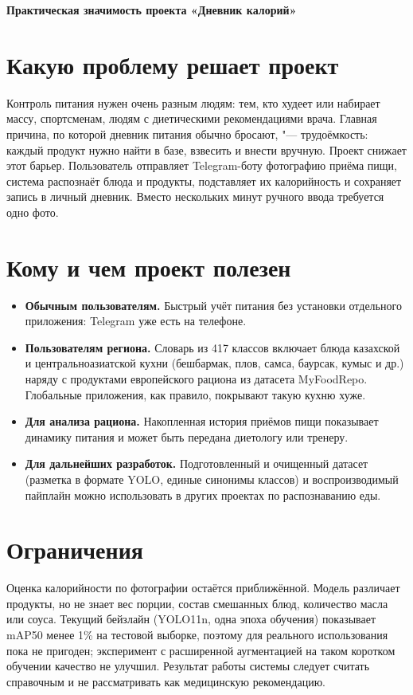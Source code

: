 \documentclass[11pt,a4paper]{article}
\begin{document}
\begin{center}
  {\large\bfseries Практическая значимость проекта «Дневник калорий»}\\[3pt]
\end{center}

\section{Какую проблему решает проект}
Контроль питания нужен очень разным людям: тем, кто худеет или набирает массу,
спортсменам, людям с диетическими рекомендациями врача. Главная причина, по которой
дневник питания обычно бросают, "--- трудоёмкость: каждый продукт нужно найти в базе,
взвесить и внести вручную. Проект снижает этот барьер. Пользователь отправляет
Telegram-боту фотографию приёма пищи, система распознаёт блюда и продукты,
подставляет их калорийность и сохраняет запись в личный дневник. Вместо нескольких
минут ручного ввода требуется одно фото.

\section{Кому и чем проект полезен}
\begin{itemize}
  \item \textbf{Обычным пользователям.} Быстрый учёт питания без установки отдельного
        приложения: Telegram уже есть на телефоне.
  \item \textbf{Пользователям региона.} Словарь из 417 классов включает блюда казахской
        и центральноазиатской кухни (бешбармак, плов, самса, баурсак, кумыс и др.)
        наряду с продуктами европейского рациона из датасета MyFoodRepo. Глобальные
        приложения, как правило, покрывают такую кухню хуже.
  \item \textbf{Для анализа рациона.} Накопленная история приёмов пищи показывает
        динамику питания и может быть передана диетологу или тренеру.
  \item \textbf{Для дальнейших разработок.} Подготовленный и очищенный датасет
        (разметка в формате YOLO, единые синонимы классов) и воспроизводимый пайплайн
        можно использовать в других проектах по распознаванию еды.
\end{itemize}

\section{Ограничения}
Оценка калорийности по фотографии остаётся приближённой. Модель различает продукты,
но не знает вес порции, состав смешанных блюд, количество масла или соуса. Текущий
бейзлайн (YOLO11n, одна эпоха обучения) показывает mAP50 менее 1\% на тестовой
выборке, поэтому для реального использования пока не пригоден; эксперимент с
расширенной аугментацией на таком коротком обучении качество не улучшил. Результат
работы системы следует считать справочным и не рассматривать как медицинскую
рекомендацию.
\end{document}
